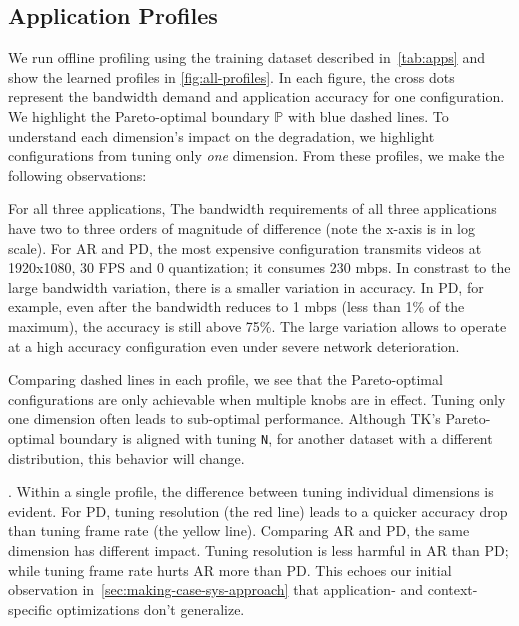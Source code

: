 \subsection{Application Profiles}
\label{sec:application-profiles}

We run offline profiling using the training dataset described
in~\autoref{tab:apps} and show the learned profiles in
\autoref{fig:all-profiles}. In each figure, the cross dots represent the
bandwidth demand and application accuracy for one configuration. We highlight
the Pareto-optimal boundary $\mathbb{P}$ with blue dashed lines. To understand
each dimension's impact on the degradation, we highlight configurations from
tuning only \textit{one} dimension. From these profiles, we make the following
observations:

 For all three applications, The bandwidth
requirements of all three applications have two to three orders of magnitude of
difference (note the x-axis is in log scale). For AR and PD, the most expensive
configuration transmits videos at 1920x1080, 30 FPS and 0 quantization; it
consumes 230 mbps. In constrast to the large bandwidth variation, there is a
smaller variation in accuracy. In PD, for example, even after the bandwidth
reduces to 1 mbps (less than 1\% of the maximum), the accuracy is still above
75\%. The large variation allows \sysname{} to operate at a high accuracy
configuration even under severe network deterioration.

 Comparing dashed lines in each
profile, we see that the Pareto-optimal configurations are only achievable when
multiple knobs are in effect. Tuning only one dimension often leads to
sub-optimal performance. Although TK's Pareto-optimal boundary is aligned with
tuning \texttt{N}, for another dataset with a different distribution, this
behavior will change. 

. Within a single profile, the
difference between tuning individual dimensions is evident. For PD, tuning
resolution (the red line) leads to a quicker accuracy drop than tuning frame
rate (the yellow line). Comparing AR and PD, the same dimension has different
impact. Tuning resolution is less harmful in AR than PD; while tuning frame rate
hurts AR more than PD\@. This echoes our initial observation
in~\autoref{sec:making-case-sys-approach} that application- and context-specific
optimizations don't generalize.


